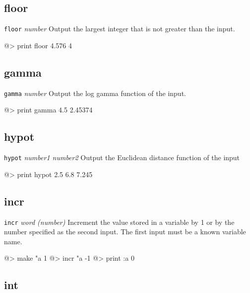 \subsection*{floor}  
 
{\tt floor} {\it number} 
\newline\newline 
Output the largest integer that is not greater than the input. 
\begin{verbatimtab} 
@> print floor 4.576 
4 
\end{verbatimtab} 
 
\subsection*{gamma}  
 
{\tt gamma} {\it number} 
\newline\newline 
Output the log gamma function of the input. 
\begin{verbatimtab} 
@> print gamma 4.5 
2.45374 
\end{verbatimtab} 
 
\subsection*{hypot}  
 
{\tt hypot} {\it number1 number2} 
\newline\newline 
Output the Euclidean distance function of the input 
\begin{verbatimtab} 
@> print hypot 2.5 6.8 
7.245 
\end{verbatimtab} 
 
\subsection*{incr}  
 
{\tt incr} {\it word (number)} 
\newline\newline 
Increment the value stored in a variable by 1 or by the number specified as the second input. The first input must be a known variable name. 
\begin{verbatimtab} 
@> make "a 1 
@> incr "a -1 
@> print :a 
0 
\end{verbatimtab}
 
\subsection*{int}  
 
